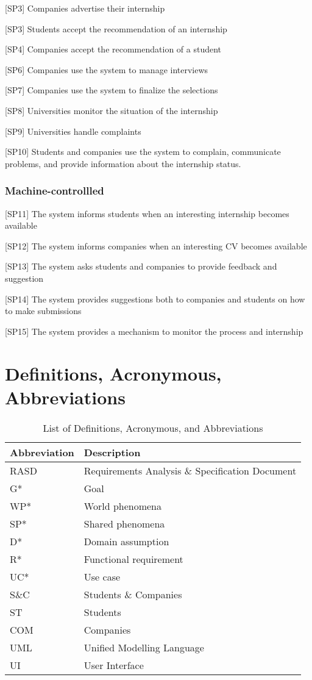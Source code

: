 [SP3] Companies advertise their internship

[SP3] Students accept the recommendation of an internship

[SP4] Companies accept the recommendation of a student

[SP6] Companies use the system to manage interviews

[SP7] Companies use the system to finalize the selections

[SP8] Universities monitor the situation of the internship

[SP9] Universities handle complaints

[SP10] Students and companies use the system to complain, communicate problems, and provide information about the internship status.

\subsubsection{Machine-controllled}
[SP11] The system informs students when an interesting internship becomes available

[SP12] The system informs companies when an interesting CV becomes available

[SP13] The system asks students and companies to provide feedback and suggestion

[SP14] The system provides suggestions both to companies and students on how to make submissions

[SP15] The system provides a mechanism to monitor the process and internship


\section{Definitions, Acronymous, Abbreviations}
\begin{table}[H]
\centering
\begin{tabular}{|l|l|}
\hline
\textbf{Abbreviation} & \textbf{Description} \\ \hline
RASD & Requirements Analysis \& Specification Document \\ \hline
G* & Goal \\ \hline
WP* & World phenomena \\ \hline
SP* & Shared phenomena \\ \hline
D* & Domain assumption \\ \hline
R* & Functional requirement \\ \hline
UC* & Use case \\ \hline
S\&C & Students \& Companies \\ \hline
ST & Students \\ \hline
COM & Companies \\ \hline
UML & Unified Modelling Language \\ \hline
UI & User Interface \\ \hline
\end{tabular}
\caption{List of Definitions, Acronymous, and Abbreviations}
\label{table:abbreviations}
\end{table}

